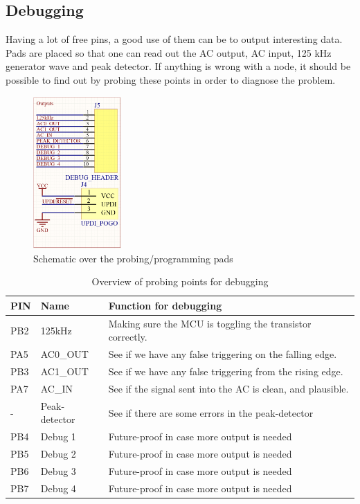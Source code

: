\subsection{Debugging}
Having a lot of free pins, a good use of them can be to output interesting data. Pads are placed so that one can read out the AC output, AC input, 125 kHz generator wave and peak detector. If anything is wrong with a node, it should be possible to find out by probing these points in order to diagnose the problem.
\begin{figure}[H]
    \centering
    \includegraphics[width=0.3\textwidth]{05_My_Implementation/figures/Outputs.png}
    \caption{Schematic over the probing/programming pads}
    \label{fig:05:outputs}
\end{figure}


\begin{table}[H]
\centering
\caption{Overview of probing points for debugging}
\label{PinDebug}
\begin{tabular}{lll}
\hline
PIN & Name          & Function for debugging                                                    \\
\hline
PB2 & 125kHz        & Making sure the MCU is toggling the transistor correctly. \\
PA5 & AC0\_OUT      & See if we have any false triggering on the falling edge.  \\
PB3 & AC1\_OUT      & See if we have any false triggering from the rising edge.   \\
PA7 & AC\_IN        & See if the signal sent into the AC is clean, and plausible.               \\
-   & Peak-detector & See if there are some errors in the peak-detector                        \\
PB4 & Debug 1       & Future-proof in case more output is needed                                \\
PB5 & Debug 2       & Future-proof in case more output is needed                                \\
PB6 & Debug 3       & Future-proof in case more output is needed                                \\
PB7 & Debug 4       & Future-proof in case more output is needed                                \\
\hline
\end{tabular}
\end{table}

